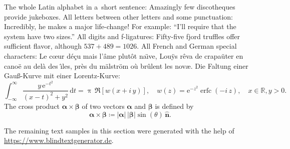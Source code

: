The whole Latin alphabet in a~short sentence: Amazingly few discotheques provide jukeboxes. All letters between other letters and some punctuation: Incredibly, he makes a major life-change! For example: ``I'll require that the system have two sizes.'' All digits and f-ligatures: Fifty-five fjord truffles offer sufficient flavor, although ${537 + 489 = 1026}$. All French and German special characters: Le c\oe ur d\'e\c cu mais l'\^ame plut\^ot na\"\i ve, Lou\"ys r\^eva de crapa\"uter en cano\"e au del\`a des \^\i les, pr\`es du m\"alstr\"om o\`u br\^ulent les nov\ae. Die Faltung einer Gau\ss-Kurve mit einer Lorentz-Kurve:
\begin{equation}
\int_{-\infty}^\infty \frac{y\,\mathrm{e}^{-t^2}}{(x-t)^2+y^2}\,\mathrm{d} t =
\uppi \, \Re[w(x + i\,y)], \quad w(z) = \mathrm{e}^{-z^2} \operatorname{erfc}(-i\, z), \quad x \in \mathbb{R}, y>0.
\end{equation}
The cross product $\bm{\alpha} \times \bm{\beta}$ of two vectors $\bm{\alpha}$ and $\bm{\beta}$ is defined by
\begin{equation}
	\bm{\alpha} \times \bm{\beta} \coloneq |\bm{\alpha}| \, |\bm{\beta}| \sin (\theta) \, \hat{\bm{n}}.
\end{equation}

The remaining text samples in this section were generated with the help of \url{https://www.blindtextgenerator.de}.

